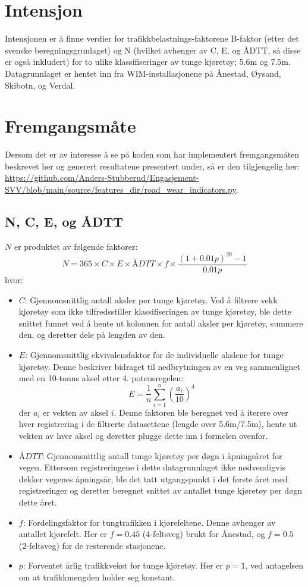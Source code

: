 \section{Intensjon}
Intensjonen er å finne verdier for trafikkbelastnings-faktorene B-faktor (etter det svenske beregningsgrunlaget) 
og N (hvilket avhenger av C, E, og ÅDTT, så disse er også inkludert) for to ulike klassifiseringer av tunge kjøretøy; 5.6m og 7.5m.
Datagrunnlaget er hentet inn fra WIM-installasjonene på Ånestad, Øysand, Skibotn, og Verdal. 


\section{Fremgangsmåte}
Dersom det er av interesse å se på koden som har implementert fremgangsmåten beskrevet her og generert resultatene presentert under,
så er den tilgjengelig her: \url{https://github.com/Anders-Stubberud/Engasjement-SVV/blob/main/source/features_dir/road_wear_indicators.py}.

\subsection{N, C, E, og ÅDTT}
\(N\) er produktet av følgende faktorer:
\[
N = 365 \times C \times E \times ÅDTT \times f \times \frac{(1 + 0.01p)^{20} - 1}{0.01p}
\]
hvor:
\begin{itemize}
    \item \(C\): Gjennomsnittlig antall aksler per tunge kjøretøy. 
    Ved å filtrere vekk kjøretøy som ikke tilfredsstiller klassifiseringen av tunge kjøretøy, 
    ble dette snittet funnet ved å hente ut kolonnen for antall aksler per kjøretøy, summere den, og deretter dele på lengden av den.
    \item \(E\): Gjennomsnittlig ekvivalensfaktor for de individuelle akslene for tunge kjøretøy. Denne beskriver bidraget til nedbrytningen av en veg sammenlignet med en 10-tonns aksel etter 4. potensregelen:
    \[
    E = \frac{1}{n} \sum_{i=1}^{n} \left(\frac{a_i}{10}\right)^4
    \]
    der \(a_i\) er vekten av aksel \(i\). Denne faktoren ble beregnet ved å iterere over hver registrering i de filtrerte datasettene (lengde over 5.6m/7.5m), 
    hente ut vekten av hver aksel og deretter plugge dette inn i formelen ovenfor.
    \item \(ÅDTT\): Gjennomsnittlig antall tunge kjøretøy per døgn i åpningsåret for vegen. Ettersom registreringene i dette datagrunnlaget ikke nødvendigvis dekker vegenes åpningsår, ble det tatt utgangspunkt i det første året med registreringer og deretter beregnet snittet av antallet tunge kjøretøy per døgn dette året.
    \item \(f\): Fordelingsfaktor for tungtrafikken i kjørefeltene. Denne avhenger av antallet kjørefelt. Her er \(f = 0.45\) (4-feltsveg) brukt for Ånestad, og \(f = 0.5\) (2-feltsveg) for de resterende stasjonene.
    \item \(p\): Forventet årlig trafikkvekst for tunge kjøretøy. Her er \(p = 1\), ved antagelsen om at trafikkmengden holder seg konstant.
\end{itemize}

